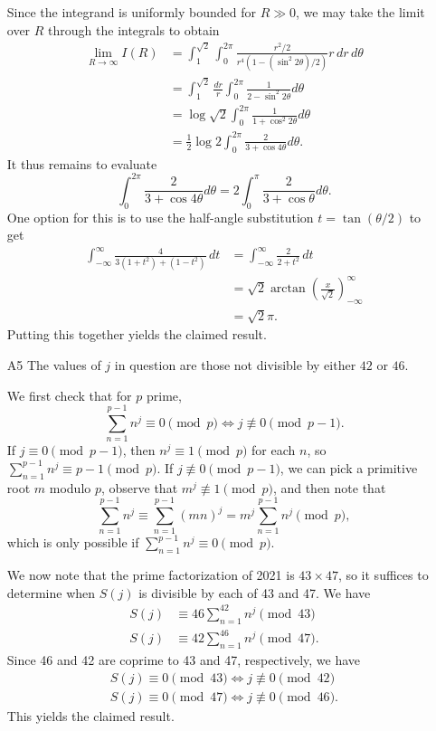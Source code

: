 \documentclass[amssymb,twocolumn,pra,10pt,aps]{revtex4-1}
\begin{document}
\begin{itemize}
Since the integrand is uniformly bounded for $R \gg 0$, we may take the limit over $R$ through the integrals to obtain
\begin{align*}
\lim_{R \to \infty} I(R) &= \int_1^{\sqrt{2}} \int_0^{2\pi} \frac{r^2/2}{r^4(1 - (\sin^2 2\theta)/2)} r\,dr\,d\theta \\
&= \int_1^{\sqrt{2}} \frac{dr}{r} \int_0^{2\pi} \frac{1}{2- \sin^2 2\theta} d\theta \\
&= \log \sqrt{2} \int_0^{2\pi} \frac{1}{1 + \cos^2 2\theta} d\theta \\
&= \frac{1}{2} \log 2 \int_0^{2\pi} \frac{2}{3 + \cos 4\theta} d\theta.
\end{align*}
It thus remains to evaluate 
\[
\int_0^{2\pi} \frac{2}{3 + \cos 4\theta} d\theta = 
2 \int_0^{\pi} \frac{2}{3 + \cos \theta} d\theta.
\]
One option for this is to use the half-angle substitution $t = \tan (\theta/2)$ to get
\begin{align*}
\int_{-\infty}^\infty \frac{4}{3(1+t^2) + (1-t^2)}\,dt
&= \int_{-\infty}^\infty \frac{2}{2+t^2}\,dt \\
&= \sqrt{2} \arctan \left( \frac{x}{\sqrt{2}} \right)^{\infty}_{-\infty} \\
&= \sqrt{2} \pi.
\end{align*}
Putting this together yields the claimed result.

\item[A5]
The values of $j$ in question are those not divisible by either $42$ or $46$.

We first check that for $p$ prime,
\[
\sum_{n=1}^{p-1} n^j \equiv 0 \pmod{p} \Leftrightarrow j \not\equiv 0 \pmod{p-1}.
\]
If $j \equiv 0 \pmod{p-1}$, then $n^j \equiv 1 \pmod{p}$ for each $n$, so $\sum_{n=1}^{p-1} n^j \equiv p-1 \pmod{p}$. If $j \not\equiv 0 \pmod{p-1}$, we can pick a primitive root $m$ modulo $p$,
observe that $m^j \not\equiv 1 \pmod{p}$, and then note that
\[
\sum_{n=1}^{p-1} n^j \equiv \sum_{n=1}^{p-1} (mn)^j = m^j \sum_{n=1}^{p-1} n^j \pmod{p},
\]
which is only possible if $\sum_{n=1}^{p-1} n^j \equiv 0 \pmod{p}$.

We now note that the prime factorization of 2021 is $43 \times 47$,
so it suffices to determine when $S(j)$ is divisible by each of 43 and 47.
We have
\begin{align*}
S(j) &\equiv 46 \sum_{n=1}^{42} n^j \pmod{43} \\
S(j) &\equiv 42 \sum_{n=1}^{46} n^j \pmod{47}.
\end{align*}
Since 46 and 42 are coprime to 43 and 47, respectively, 
we have 
\begin{gather*}
S(j) \equiv 0 \pmod{43} \Leftrightarrow j \not\equiv 0 \pmod{42} \\
S(j) \equiv 0 \pmod{47} \Leftrightarrow j \not\equiv 0 \pmod{46}.
\end{gather*}
This yields the claimed result.


\end{itemize}
\end{document}
